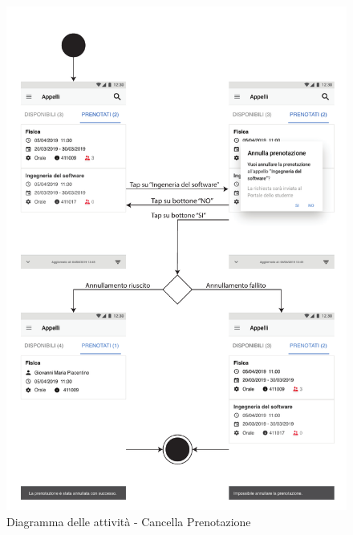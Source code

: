 \begin{figure}
	\centering
	\includegraphics[width=6in]{imgs/gruppo1/activity_diagrams/AD12_cancella_prenotazione.pdf}
	\caption{Diagramma delle attività - Cancella Prenotazione}
	\label{diag:cancellaPrenotazioneAD}
\end{figure}

\clearpage